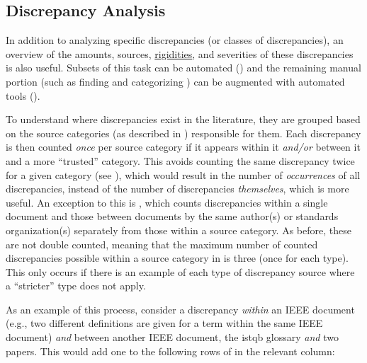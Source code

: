 \subsection{Discrepancy Analysis}
\label{discrep-analysis}

In addition to analyzing specific discrepancies (or classes of discrepancies),
an overview of the amounts, sources, \hyperref[rigidity]{rigidities}, and
severities of these discrepancies is also
useful. Subsets of this task can be automated ()
and the remaining manual portion (such as finding and categorizing
) can be augmented with automated
tools ().

To understand where discrepancies exist in the literature, they are
grouped based on the source categories (as described in )
responsible for them. Each discrepancy is then counted \emph{once} per source
category if it appears within it \emph{and/or} between it and a more
``trusted'' category.
This avoids counting the same discrepancy twice for a given category (see
), which would result in the number of
\emph{occurrences} of all discrepancies, instead of the number of discrepancies
\emph{themselves}, which is more useful. An exception to this is
, which counts discrepancies within a single document
and those between documents by the same author(s) or standards organization(s)
separately from those within a source category. As before, these are not double
counted, meaning that the maximum number of counted discrepancies possible
within a source category in  is three (once for each
type). This only occurs if there is an example of each type of discrepancy
source where a ``stricter'' type does not apply.

\label{discrep-analysis-example}
As an example of this process, consider a discrepancy \emph{within} an IEEE
document (e.g., two different definitions are given for a term within the same
IEEE document) \emph{and} between another IEEE document, the \acs{istqb}
glossary \emph{and} two papers. This would add one to the
following rows of  in the relevant column:

